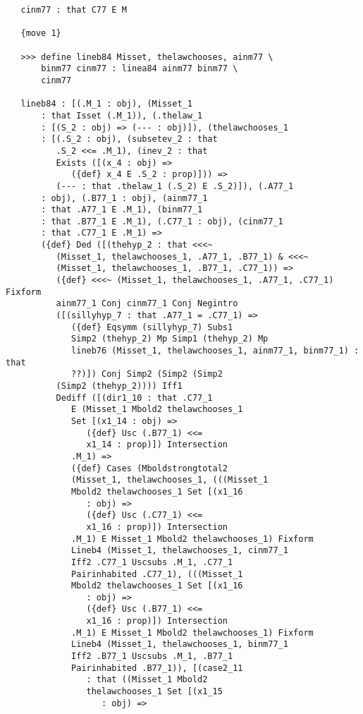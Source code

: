 \documentclass[12pt]{article}
\begin{document}
\begin{verbatim}
   cinm77 : that C77 E M

   {move 1}

   >>> define lineb84 Misset, thelawchooses, ainm77 \
       binm77 cinm77 : linea84 ainm77 binm77 \
       cinm77

   lineb84 : [(.M_1 : obj), (Misset_1 
       : that Isset (.M_1)), (.thelaw_1 
       : [(S_2 : obj) => (--- : obj)]), (thelawchooses_1 
       : [(.S_2 : obj), (subsetev_2 : that 
          .S_2 <<= .M_1), (inev_2 : that 
          Exists ([(x_4 : obj) => 
             ({def} x_4 E .S_2 : prop)])) => 
          (--- : that .thelaw_1 (.S_2) E .S_2)]), (.A77_1 
       : obj), (.B77_1 : obj), (ainm77_1 
       : that .A77_1 E .M_1), (binm77_1 
       : that .B77_1 E .M_1), (.C77_1 : obj), (cinm77_1 
       : that .C77_1 E .M_1) => 
       ({def} Ded ([(thehyp_2 : that <<<~ 
          (Misset_1, thelawchooses_1, .A77_1, .B77_1) & <<<~ 
          (Misset_1, thelawchooses_1, .B77_1, .C77_1)) => 
          ({def} <<<~ (Misset_1, thelawchooses_1, .A77_1, .C77_1) Fixform 
          ainm77_1 Conj cinm77_1 Conj Negintro 
          ([(sillyhyp_7 : that .A77_1 = .C77_1) => 
             ({def} Eqsymm (sillyhyp_7) Subs1 
             Simp2 (thehyp_2) Mp Simp1 (thehyp_2) Mp 
             lineb76 (Misset_1, thelawchooses_1, ainm77_1, binm77_1) : that 
             ??)]) Conj Simp2 (Simp2 (Simp2 
          (Simp2 (thehyp_2)))) Iff1 
          Dediff ([(dir1_10 : that .C77_1 
             E (Misset_1 Mbold2 thelawchooses_1 
             Set [(x1_14 : obj) => 
                ({def} Usc (.B77_1) <<= 
                x1_14 : prop)]) Intersection 
             .M_1) => 
             ({def} Cases (Mboldstrongtotal2 
             (Misset_1, thelawchooses_1, (((Misset_1 
             Mbold2 thelawchooses_1 Set [(x1_16 
                : obj) => 
                ({def} Usc (.C77_1) <<= 
                x1_16 : prop)]) Intersection 
             .M_1) E Misset_1 Mbold2 thelawchooses_1) Fixform 
             Lineb4 (Misset_1, thelawchooses_1, cinm77_1 
             Iff2 .C77_1 Uscsubs .M_1, .C77_1 
             Pairinhabited .C77_1), (((Misset_1 
             Mbold2 thelawchooses_1 Set [(x1_16 
                : obj) => 
                ({def} Usc (.B77_1) <<= 
                x1_16 : prop)]) Intersection 
             .M_1) E Misset_1 Mbold2 thelawchooses_1) Fixform 
             Lineb4 (Misset_1, thelawchooses_1, binm77_1 
             Iff2 .B77_1 Uscsubs .M_1, .B77_1 
             Pairinhabited .B77_1)), [(case2_11 
                : that ((Misset_1 Mbold2 
                thelawchooses_1 Set [(x1_15 
                   : obj) => 

\end{verbatim}
\end{document}
